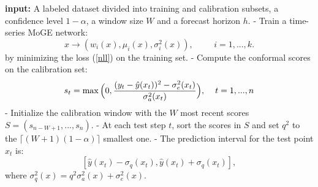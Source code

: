 \begin{algorithm}[t]
\begin{algorithmic}
 \caption{ CP-MoG  algorithm } \label{alg1}
\State   \textbf{input:} A labeled dataset divided into training and calibration subsets, a confidence level $1\!-\!\alpha$, a window size $W$ and a forecast horizon $h$.
\State - Train a time-series MoGE network:
$$   x  \rightarrow  ( w_i(x), \mu_i(x), \sigma^2_i(x)), \hspace{1cm} i=1,...,k. $$
by minimizing the loss (\ref{nll}) on the training set.
\State  - Compute the conformal scores on the calibration set:
 $$s_t = \max\Big(0,\frac{(y_t-\hat{y}(x_t))^2-\sigma_e^2(x_t)}{\sigma_a^2(x_t)}\Big) , \hspace{4mm} t=1,...,n$$
\State - Initialize the calibration window with the $W$ most recent scores $S=(s_{n-W+1},...,s_n)$.
\State - At each test step $t$, sort the scores in $S$ and set $q^2$ to the $\lceil (W\!+\!1)(1\!-\!\alpha)\rceil$ smallest one.
\State - The prediction interval for the test point $x_t$ is:
  $$ [\hat{y}(x_t) - \sigma_q(x_t),
      \hat{y}(x_t) + \sigma_q(x_t)], 
    $$
    where $\sigma_q^2(x)= q^2 \sigma_a^2(x) + \sigma_e^2(x)$.


   \end{algorithmic}
\end{algorithm}

